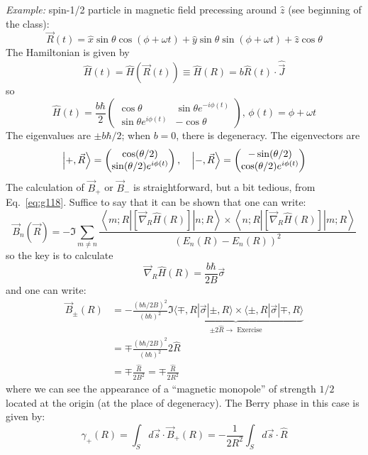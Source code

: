 \documentclass[12pt]{article}
\newcommand{\be}{\begin{equation}}
\newcommand{\ee}{\end{equation}}
\begin{document}
\emph{Example:} spin-1/2 particle in magnetic field
precessing around $\hat{z}$ (see beginning of the class):
\[
\vec{R}(t)=\hat{x} \sin \theta \cos (\phi+\omega t)+ \hat{y} \sin \theta \sin (\phi+\omega t)+\hat{z} \cos \theta
\]
The Hamiltonian is given by
\[
\hat{H}(t)=\hat{H}(\vec{R}(t)) \equiv \hat{H}(R)=b \hat{R}(t) \cdot \hat{\vec{J}}
\]
so
\be
\hat{H}(t) = 
\frac{b\hbar}{2}
\begin{pmatrix}
 \cos\theta & \sin\theta e^{-i\phi(t)}\\
\sin\theta e^{ i\phi(t)} & -\cos\theta
\end{pmatrix},\,
\phi(t) = \phi+\omega t
\ee
The eigenvalues are $\pm b \hbar / 2$; when $b=0$, there is
degeneracy. The eigenvectors are
\[
\ket{+,\vec{R}} = \begin{pmatrix} \cos(\theta/2)\\\sin(\theta/2)e^{ i\phi(t)}\end{pmatrix},\quad
\ket{-,\vec{R}} = \begin{pmatrix} -\sin(\theta/2)\\\cos(\theta/2)e^{ i\phi(t)}\end{pmatrix}
\]
The calculation of $\vec{B}_+$ or $\vec{B}_-$ is straightforward, but a bit tedious, from Eq.~\eqref{eq:g118}.
Suffice to say that it can be shown that one can write:
\[
\vec{B}_{n}(\vec{R})=-\Im \sum_{m \neq n} \frac{\left\langle m ; R\left|\left[\vec{\nabla}_{R} \hat{H}(R)\right]\right| n ; R\right\rangle \times\left\langle n ; R\left|\left[\vec{\nabla}_{R} \hat{H}(R)\right]\right| m ; R\right\rangle}{\left(E_{n}(R)-E_{n}(R)\right)^{2}}
\]
so the key is to calculate
\be
\vec{\nabla}_{\!R}  \hat{H}(R)=\frac{b \hbar}{2 B} \vec{\sigma}
\ee
and one can write:
\be
\begin{aligned}
\vec{B}_{\pm}(R)
&=-\frac{(b \hbar / 2 B)^{2}}{(b \hbar)^{2}} 
\underbrace{\Im \langle\mp, R|\vec{\sigma}| \pm, R \rangle \times
    \langle\pm, R|\vec{\sigma}| \mp, R \rangle}%
    _{\pm 2\hat{R}\to\text{ Exercise}}\\
&=\mp \frac{(b \hbar / 2 B)^{2}}{(b \hbar)^{2}} 2 \hat{R}\\
&=\mp \frac{\hat{R}}{2 B^{2}}=\mp \frac{\hat{R}}{2 R^{2}}
\end{aligned}
\ee
where we can see the appearance of a ``magnetic monopole'' of strength $1 / 2$ located at the
origin (at the place of degeneracy).
The Berry phase in this case is given by:
\be
\gamma_{+}(R)=\int_{S} d \vec{s} \cdot \vec{B}_{+}(R)=-\frac{1}{2 R^{2}} \int_{S} d \vec{s} \cdot \hat{R}
\ee
\end{document}
